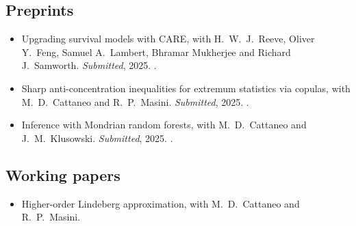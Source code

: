 \documentclass{wgu-cv}
\begin{document}
\subsection{Preprints}{}
\begin{itemize}

  \item Upgrading survival models with CARE,
    with H.\ W.\ J.\ Reeve, Oliver Y.\ Feng,
    Samuel A.\ Lambert, Bhramar Mukherjee and Richard J.\ Samworth.
    \emph{Submitted}, 2025.
    .

  \item Sharp anti-concentration inequalities
    for extremum statistics via copulas,
    with M.\ D.\ Cattaneo and R.\ P.\ Masini.
    \emph{Submitted}, 2025.
    .

  \item Inference with Mondrian random forests,
    with M.\ D.\ Cattaneo and J.\ M.\ Klusowski.
    \emph{Submitted}, 2025.
    .

\end{itemize}

\subsection{Working papers}{}
\begin{itemize}

  \item Higher-order Lindeberg approximation,
    with M.\ D.\ Cattaneo and R.\ P.\ Masini.

\end{itemize}
\end{document}
